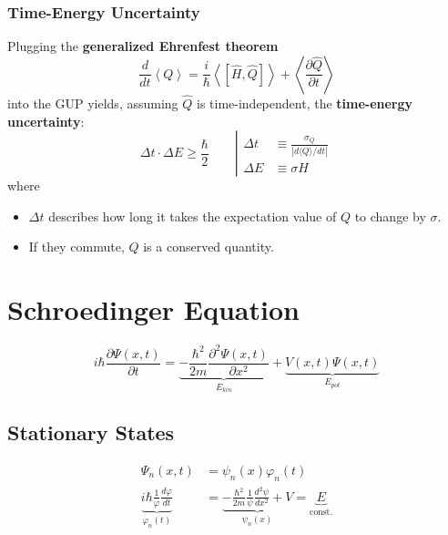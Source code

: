 \subsubsection{Time-Energy Uncertainty}
Plugging the \textbf{generalized Ehrenfest theorem}
\begin{equation*}
    \frac{d}{dt}\left\langle Q\right\rangle=\frac{i}{\hbar}\left\langle\left[\hat{H},\hat{Q}\right]\right\rangle+\left\langle\frac{\partial\hat{Q}}{\partial t}\right\rangle
\end{equation*}
into the GUP yields, assuming $\hat{Q}$ is time-independent, the \textbf{time-energy uncertainty}:
\begin{equation*}
    \Delta t\cdot\Delta E\geqslant\frac\hbar2 \qquad \left|\begin{matrix}
        \Delta t & \equiv \frac{\sigma_Q}{|d\langle Q\rangle/dt|} \\
        \Delta E & \equiv \sigma H
    \end{matrix}\right.
\end{equation*}
where


\begin{itemize}
    \item $\Delta t$ describes how long it takes the expectation value of $Q$ to change by $\sigma$.
    \item If they commute, $Q$ is a conserved quantity.
\end{itemize}

\newcol{}
\section{Schroedinger Equation}
\noindent\begin{equation*}
    i\hbar \frac{\partial \Psi(x,t)}{\partial t}           = \underbrace{- \frac{\hbar^2}{2m} \frac{\partial^2 \Psi(x,t)}{\partial x^2}}_{E_{kin}} + \underbrace{V(x,t)\Psi(x,t)}_{E_{pot}}
\end{equation*}
\subsection{Stationary States}
\noindent\begin{align*}
    \Psi_n(x,t)                                                        & = \psi_n(x)\varphi_n(t)                                                                                         \\
    \underbrace{i\hbar\frac1\varphi\frac{d\varphi}{dt}}_{\varphi_n(t)} & =\underbrace{-\frac{\hbar^2}{2m}\frac1\psi\frac{d^2\psi}{dx^2}+V}_{\psi_n (x)} = \underbrace{E}_{\text{const.}}
\end{align*}

